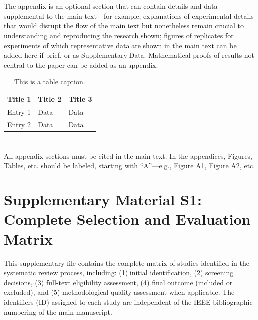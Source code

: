 \section[\appendixname~\thesection]{}
\subsection[\appendixname~\thesubsection]{}
The appendix is an optional section that can contain details and data supplemental to the main text---for example, explanations of experimental details that would disrupt the flow of the main text but nonetheless remain crucial to understanding and reproducing the research shown; figures of replicates for experiments of which representative data are shown in the main text can be added here if brief, or as Supplementary Data. Mathematical proofs of results not central to the paper can be added as an appendix.

\begin{table}[H] 
\caption{This is a table caption.\label{tab5}}
\begin{tabularx}{\textwidth}{CCC}
\toprule
\textbf{Title 1} & \textbf{Title 2} & \textbf{Title 3}\\
\midrule
Entry 1 & Data & Data\\
Entry 2 & Data & Data\\
\bottomrule
\end{tabularx}
\end{table}

\section[\appendixname~\thesection]{}
All appendix sections must be cited in the main text. In the appendices, Figures, Tables, etc. should be labeled, starting with ``A''---e.g., Figure A1, Figure A2, etc.



\appendix
\section*{Supplementary Material S1: Complete Selection and Evaluation Matrix}

This supplementary file contains the complete matrix of studies identified in the systematic review process, including: (1) initial identification, (2) screening decisions, (3) full-text eligibility assessment, (4) final outcome (included or excluded), and (5) methodological quality assessment when applicable. The identifiers (ID) assigned to each study are independent of the IEEE bibliographic numbering of the main manuscript.

